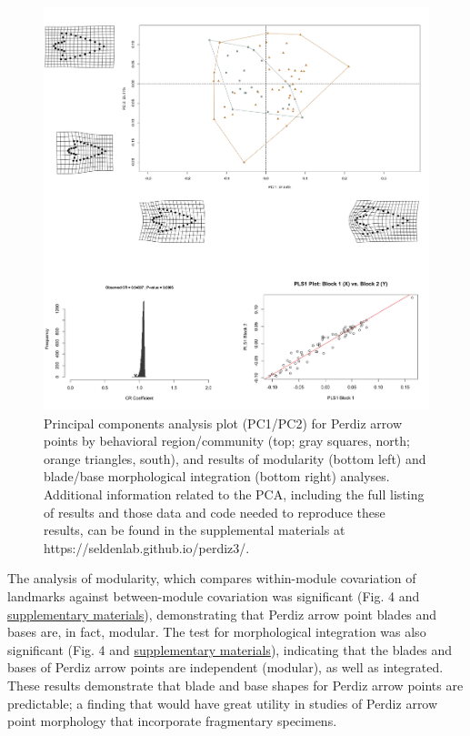 \documentclass[smallextended]{svjour3}       %
\begin{document}
\begin{figure}
\includegraphics[width=1\linewidth]{ms-figs/figure4} \caption{Principal components analysis plot (PC1/PC2) for Perdiz arrow points by behavioral region/community (top; gray squares, north; orange triangles, south), and results of modularity (bottom left) and blade/base morphological integration (bottom right) analyses. Additional information related to the PCA, including the full listing of results and those data and code needed to reproduce these results, can be found in the supplemental materials at https://seldenlab.github.io/perdiz3/.}\label{fig:fig4}
\end{figure}

The analysis of modularity, which compares within-module covariation of
landmarks against between-module covariation was significant (Fig. 4 and
\href{https://seldenlab.github.io/perdiz3/}{supplementary materials}),
demonstrating that Perdiz arrow point blades and bases are, in fact,
modular. The test for morphological integration was also significant
(Fig. 4 and \href{https://seldenlab.github.io/perdiz3/}{supplementary
materials}), indicating that the blades and bases of Perdiz arrow points
are independent (modular), as well as integrated. These results
demonstrate that blade and base shapes for Perdiz arrow points are
predictable; a finding that would have great utility in studies of
Perdiz arrow point morphology that incorporate fragmentary specimens.
\end{document}
